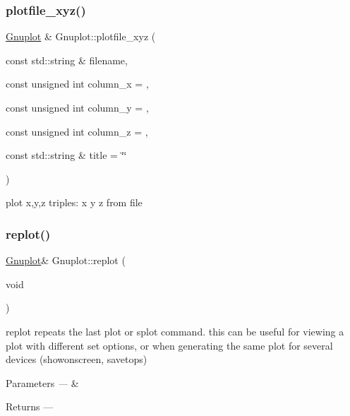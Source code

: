 \subsubsection{\texorpdfstring{plotfile\+\_\+xyz()}{plotfile\_xyz()}}
{\footnotesize\ttfamily \hyperlink{classGnuplot}{Gnuplot} \& Gnuplot\+::plotfile\+\_\+xyz (\begin{DoxyParamCaption}\item[{const std\+::string \&}]{filename,  }\item[{const unsigned int}]{column\+\_\+x = {},  }\item[{const unsigned int}]{column\+\_\+y = {},  }\item[{const unsigned int}]{column\+\_\+z = {},  }\item[{const std\+::string \&}]{title = {\ttfamily \char`\"{}\char`\"{}} }\end{DoxyParamCaption})}

plot x,y,z triples\+: x y z from file \mbox{\label{classGnuplot_a34c1b3e877d246a841a29f857a29f502}} 
\subsubsection{\texorpdfstring{replot()}{replot()}}
{\footnotesize\ttfamily \hyperlink{classGnuplot}{Gnuplot}\& Gnuplot\+::replot (\begin{DoxyParamCaption}\item[{void}]{ }\end{DoxyParamCaption})\hspace{0.3cm}{\ttfamily [inline]}}



replot repeats the last plot or splot command. this can be useful for viewing a plot with different set options, or when generating the same plot for several devices (showonscreen, savetops) 


\begin{DoxyParams}{Parameters}
{\em ---} & \\
\hline
\end{DoxyParams}
\begin{DoxyReturn}{Returns}
--- 
\end{DoxyReturn}
\mbox{\label{classGnuplot_af845efc728a90d7e10de764eff0b2423}} 
